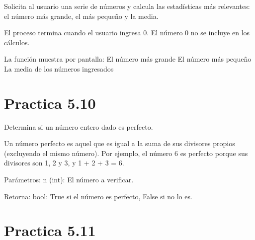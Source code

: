 \documentclass[letterpaper,10pt,spanish]{sphinxmanual}
\begin{document}
\begin{fulllineitems}
\label{\detokenize{pr5:pr5.9.estadisticas_numeros}}
\pysigstartsignatures
{}
\pysigstopsignatures
\sphinxAtStartPar
Solicita al usuario una serie de números y calcula las estadísticas más relevantes:
el número más grande, el más pequeño y la media.

\sphinxAtStartPar
El proceso termina cuando el usuario ingresa 0. El número 0 no se incluye en los cálculos.

\sphinxAtStartPar
La función muestra por pantalla:
\sphinxhyphen{} El número más grande
\sphinxhyphen{} El número más pequeño
\sphinxhyphen{} La media de los números ingresados

\end{fulllineitems}



\section{Practica 5.10}
\label{\detokenize{pr5:module-pr5.10}}\label{\detokenize{pr5:practica-5-10}}

\begin{fulllineitems}
\label{\detokenize{pr5:pr5.10.es_numero_perfecto}}
\pysigstartsignatures
{}
\pysigstopsignatures
\sphinxAtStartPar
Determina si un número entero dado es perfecto.

\sphinxAtStartPar
Un número perfecto es aquel que es igual a la suma de sus divisores propios
(excluyendo el mismo número). Por ejemplo, el número 6 es perfecto porque
sus divisores son 1, 2 y 3, y 1 + 2 + 3 = 6.

\sphinxAtStartPar
Parámetros:
n (int): El número a verificar.

\sphinxAtStartPar
Retorna:
bool: True si el número es perfecto, False si no lo es.

\end{fulllineitems}



\section{Practica 5.11}
\label{\detokenize{pr5:module-pr5.11}}\label{\detokenize{pr5:practica-5-11}}
\end{document}
